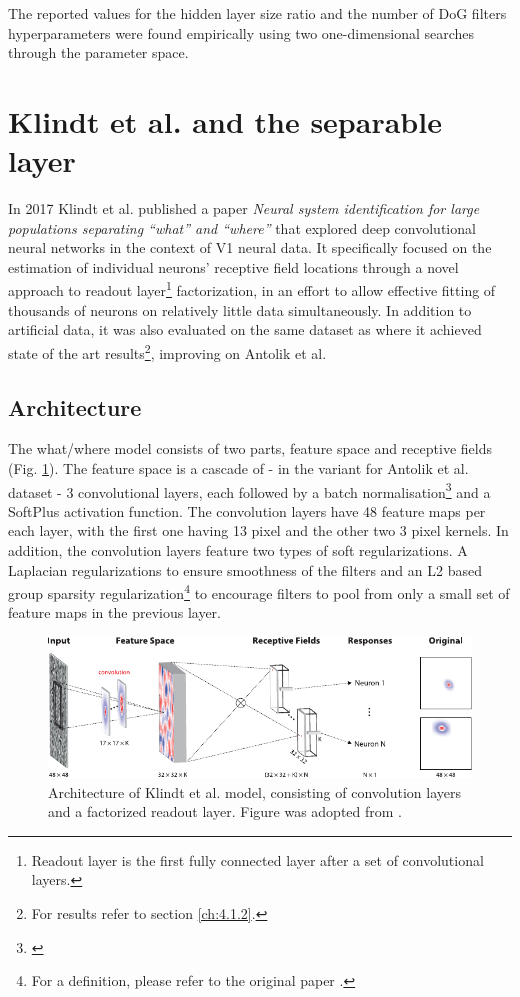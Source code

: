 The reported values for the hidden layer size ratio and the number of DoG filters hyperparameters were found empirically using two one-dimensional searches through the parameter space.

\section{Klindt et al. and the separable layer}\label{ch:2.2}

In 2017 Klindt et al. published a paper \textit{Neural system identification for large populations separating “what” and “where”} \citep{klindt} that explored deep convolutional neural networks in the context of V1 neural data. It specifically focused on the estimation of individual neurons’ receptive field locations through a novel approach to readout layer\footnote{Readout layer is the first fully connected layer after a set of convolutional layers.} factorization, in an effort to allow effective fitting of thousands of neurons on relatively little data simultaneously. In addition to artificial data, it was also evaluated on the same dataset as \cite{antolik} where it achieved state of the art results\footnote{For results refer to section \ref{ch:4.1.2}.}, improving on Antolik et al.

\subsection{Architecture}

The what/where model consists of two parts, feature space and receptive fields (Fig. \ref{fig:2.2}). The feature space is a cascade of - in the variant for Antolik et al. dataset - 3 convolutional layers, each followed by a batch normalisation\footnote{\citep{2015arXiv150203167I}} and a SoftPlus activation function. The convolution layers have 48 feature maps per each layer, with the first one having 13 pixel and the other two 3 pixel kernels. In addition, the convolution layers feature two types of soft regularizations. A Laplacian regularizations to ensure smoothness of the filters and an L2 based group sparsity regularization\footnote{For a definition, please refer to the original paper \citep{klindt}.} to encourage filters to pool from only a small set of feature maps in the previous layer.

\begin{figure}[h]
    \centering
    \includegraphics[width=1\textwidth]{../figures/02_fig2}
    \caption[klindt et al. model]{Architecture of Klindt et al. model, consisting of convolution layers and a factorized readout layer. Figure was adopted from \cite{klindt}.}
    \label{fig:2.2}
\end{figure}

